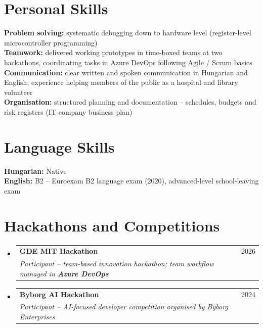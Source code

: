 \documentclass[a4paper,11pt]{article}
\makeatletter
\newcommand{\resumeSubheading}[4]{
  \vspace{-2pt}\item
    \begin{tabular*}{0.97\textwidth}[t]{l@{\extracolsep{\fill}}r}
      \textbf{#1} & #2 \\
      \textit{\small #3} & \textit{\small #4} \\
    \end{tabular*}\vspace{-7pt}
}
\newcommand{\resumeSubHeadingListStart}{\begin{itemize}[leftmargin=0.15in, label={}]}
\newcommand{\resumeSubHeadingListEnd}{\end{itemize}}
\makeatother
\begin{document}
\section{Personal Skills}
 \begin{itemize}[leftmargin=0.15in, label={}]
    \small{\item{
     \textbf{Problem solving:} systematic debugging down to hardware level (register-level microcontroller programming) \\
     \textbf{Teamwork:} delivered working prototypes in time-boxed teams at two hackathons, coordinating tasks in Azure DevOps
       following Agile / Scrum basics \\
     \textbf{Communication:} clear written and spoken communication in Hungarian and English; experience helping members of
       the public as a hospital and library volunteer \\
     \textbf{Organisation:} structured planning and documentation -- schedules, budgets and risk registers (IT company
       business plan)
    }}
 \end{itemize}

\section{Language Skills}
 \begin{itemize}[leftmargin=0.15in, label={}]
    \small{\item{
     \textbf{Hungarian:} Native \\
     \textbf{English:} B2 -- Euroexam B2 language exam (2020), advanced-level school-leaving exam
    }}
 \end{itemize}

\section{Hackathons and Competitions}
  \resumeSubHeadingListStart
    \resumeSubheading
      {GDE MIT Hackathon}{2026}
      {Participant -- team-based innovation hackathon; team workflow managed in \textbf{Azure DevOps}}{}
    \resumeSubheading
      {Byborg AI Hackathon}{2024}
      {Participant -- AI-focused developer competition organised by Byborg Enterprises}{}
  \resumeSubHeadingListEnd
\end{document}
